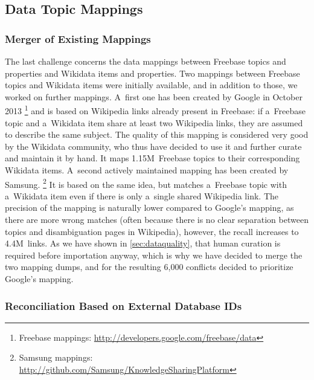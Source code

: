 \documentclass{sig-alternate}
\begin{document}
\subsection{Data Topic Mappings}

\subsubsection{Merger of Existing Mappings}

The last challenge concerns the data mappings between Freebase topics and properties
and Wikidata items and properties.
Two mappings between Freebase topics and Wikidata items were initially available,
and in addition to those, we worked on further mappings.
A~first one has been created by Google in October 2013%
\footnote{Freebase mappings: \url{http://developers.google.com/freebase/data}}
and is based on Wikipedia links already present in Freebase: if a~Freebase topic and
a~Wikidata item share at least two Wikipedia links, they are assumed to describe the same subject.
The quality of this mapping is considered very good by the Wikidata community,
who thus have decided to use it and further curate and maintain it by hand.
It maps 1.15M~Freebase topics to their corresponding Wikidata items.
A~second actively maintained mapping has been created by Samsung.%
\footnote{Samsung mappings: \url{http://github.com/Samsung/KnowledgeSharingPlatform}}
It is based on the same idea, but matches a~Freebase topic with a~Wikidata item
even if there is only a~single shared Wikipedia link.
The precision of the mapping is naturally lower compared to Google's mapping,
as there are more wrong matches (often because there is no clear separation between topics
and disambiguation pages in Wikipedia), however, the recall increases to 4.4M~links.
As we have shown in \autoref{sec:dataquality},
that human curation is required before importation anyway,
which is why we have decided to merge the two mapping dumps,
and for the resulting 6,000 conflicts decided to prioritize Google's mapping.

\subsubsection{Reconciliation Based on External Database IDs}
\end{document}
